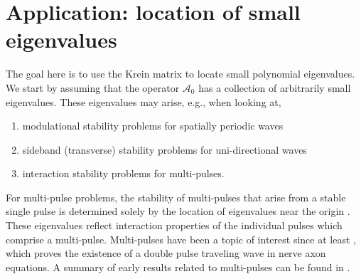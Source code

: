 \documentclass[review,onefignum,onetabnum]{siamart171218}
\newcommand{\rmi}{\mathrm{i}}
\newcommand{\calA}{\mathcal{A}}
\begin{document}

\section{Application: location of small eigenvalues}\label{s:5}

The goal here is to use the Krein matrix to locate small polynomial eigenvalues.
We start by assuming that the operator $\calA_0$ has a collection of arbitrarily small eigenvalues. These eigenvalues may arise, e.g., when looking at,
\begin{enumerate}
  \item modulational stability problems for spatially periodic waves
  \item sideband (transverse) stability problems for uni-directional waves
  \item interaction stability problems for multi-pulses.
\end{enumerate}
For multi-pulse problems, the stability of multi-pulses that arise from a stable single pulse is determined solely by the location of eigenvalues near the origin \cite{sandstede:som98}. These eigenvalues reflect interaction properties of the individual pulses which comprise a multi-pulse. Multi-pulses have been a topic of interest since at least \cite{Evans1982}, which proves the existence of a double pulse traveling wave in nerve axon equations. A summary of early results related to multi-pulses can be found in \cite[Section 1]{sandstede:som98}.
\end{document}
